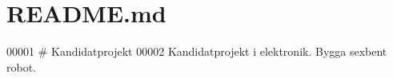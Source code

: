\hypertarget{_readme_8md_source}{}\section{R\+E\+A\+D\+M\+E.\+md}

\begin{DoxyCode}
00001 # Kandidatprojekt
00002 Kandidatprojekt i elektronik. Bygga sexbent robot.
\end{DoxyCode}
